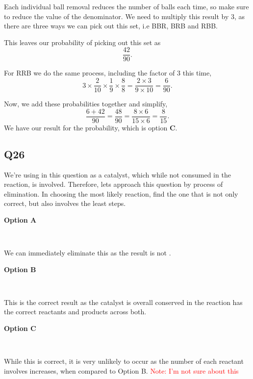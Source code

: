 \documentclass[11pt]{article}
\begin{document}
Each individual ball removal reduces the number of balls each time, so make sure to reduce the value of the denominator.  We need to multiply this result by 3, as there are three ways we can pick out this set, i.e BBR, BRB and RBB.

This leaves our probability of picking out this set as
\begin{equation*}
\frac{42}{90}.
\end{equation*}

For RRB we do the same process, including the factor of 3 this time,
\begin{equation*}
3 \times \frac{2}{10} \times \frac{1}{9} \times \frac{8}{8} = \frac{2 \times 3}{9 \times 10} = \frac{6}{90}.
\end{equation*}

Now, we add these probabilities together and simplify,
\begin{equation*}
\frac{6+42}{90} = \frac{48}{90} = \frac{8 \times 6}{15 \times 6} = \frac{8}{15}.
\end{equation*}
We have our result for the probability, which is option \textbf{C}.

\subsection*{Q26}
We're using  in this question as a catalyst, which while not consumed in the reaction, is involved.  Therefore, lets approach this question by process of elimination.  In choosing the most likely reaction, find the one that is not only correct, but also involves the least steps.  

\textbf{Option A}


\\

We can immediately eliminate this as the result is not .

\textbf{Option B}


 \\
 
 This is the correct result as the catalyst is overall conserved in the reaction has the correct reactants and products across both.
 
 \textbf{Option C}
 
 
 \\
 
While this is correct, it is very unlikely to occur as the number of each reactant involves increases, when compared to Option B. \textcolor{red}{Note: I'm not sure about this}
\end{document}
